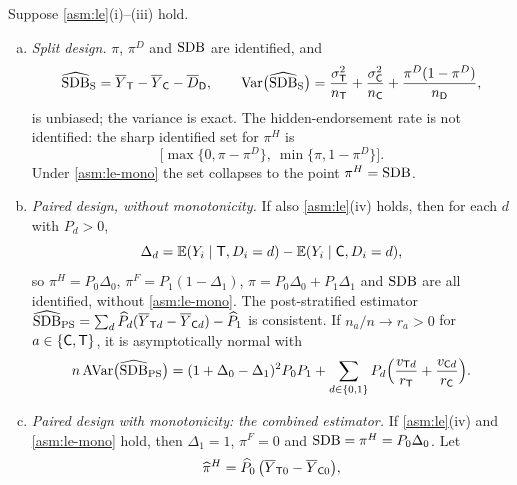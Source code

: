 \begin{theorem}\label{thm:joint-sdb}
Suppose \cref{asm:le}(i)--(iii) hold.
\begin{enumerate}[(a)]
  \item \emph{Split design.} $\pi$, $\pi^D$ and $\mathrm{SDB}$ are identified, and
  \begin{equation}\label{eq:le-split}
    \widehat{\mathrm{SDB}}_{\mathrm S}=\overline Y_{\mathsf{T}}-\overline Y_{\mathsf{C}}-\overline D_{\mathsf{D}},\qquad
    \operatorname{Var}\bigl(\widehat{\mathrm{SDB}}_{\mathrm S}\bigr)=\frac{\sigma_{\mathsf{T}}^2}{n_{\mathsf{T}}}+\frac{\sigma_{\mathsf{C}}^2}{n_{\mathsf{C}}}+\frac{\pi^D(1-\pi^D)}{n_{\mathsf{D}}},
  \end{equation}
  is unbiased; the variance is exact. The hidden-endorsement rate is not identified: the sharp identified set for $\pi^H$ is
  \begin{equation}\label{eq:le-bounds}
    \bigl[\max\{0,\pi-\pi^D\},\ \min\{\pi,1-\pi^D\}\bigr].
  \end{equation}
  Under \cref{asm:le-mono} the set collapses to the point $\pi^H=\mathrm{SDB}$.
  \item \emph{Paired design, without monotonicity.} If also \cref{asm:le}(iv) holds, then for each $d$ with $P_d>0$,
  \begin{equation}\label{eq:le-strat}
    \Delta_d=\mathbb{E}(Y_i\mid\mathsf{T},D_i=d)-\mathbb{E}(Y_i\mid\mathsf{C},D_i=d),
  \end{equation}
  so $\pi^H=P_0\Delta_0$, $\pi^F=P_1(1-\Delta_1)$, $\pi=P_0\Delta_0+P_1\Delta_1$ and $\mathrm{SDB}$ are all identified, without \cref{asm:le-mono}. The post-stratified estimator $\widehat{\mathrm{SDB}}_{\mathrm{PS}}=\sum_d\widehat P_d(\overline Y_{\mathsf{T} d}-\overline Y_{\mathsf{C} d})-\widehat P_1$ is consistent. If $n_a/n\to r_a>0$ for $a\in\{\mathsf{C},\mathsf{T}\}$, it is asymptotically normal with
  \begin{equation}\label{eq:le-vps}
    n\,\mathrm{AVar}\bigl(\widehat{\mathrm{SDB}}_{\mathrm{PS}}\bigr)=(1+\Delta_0-\Delta_1)^2P_0P_1+\sum_{d\in\{0,1\}}P_d\Bigl(\frac{v_{\mathsf{T} d}}{r_{\mathsf{T}}}+\frac{v_{\mathsf{C} d}}{r_{\mathsf{C}}}\Bigr).
  \end{equation}
  \item \emph{Paired design with monotonicity: the combined estimator.} If \cref{asm:le}(iv) and \cref{asm:le-mono} hold, then $\Delta_1=1$, $\pi^F=0$ and $\mathrm{SDB}=\pi^H=P_0\Delta_0$. Let
  \begin{equation}\label{eq:le-comb}
    \widehat\pi^H=\widehat P_0\,\bigl(\overline Y_{\mathsf{T}0}-\overline Y_{\mathsf{C}0}\bigr),
  \end{equation}

\end{enumerate}
\end{theorem}
